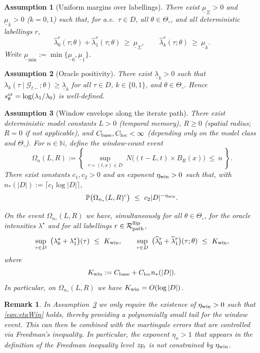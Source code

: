 \documentclass{statsoc}
\newtheorem{assumption}[assumption]{Assumption}
\newtheorem{remark}[remark]{Remark}
\newcommand{\bbP}{\mathbb{P}}
\newcommand{\1}{\mathbbm{1}}
\newcommand{\bbN}{\mathbb{N}}
\begin{document}
\begin{assumption}[Uniform margins over labellings]\label{ass:G1}
There exist $\underline\mu_\Sigma>0$ and $\underline\mu_k>0$ ($k=0,1$) such that, for a.e.\ $\tau\in D$, all $\theta\in\Theta_\circ$, and all deterministic labellings $r$,
\[
\widehat\lambda_0^r(\tau;\theta)+\widehat\lambda_1^r(\tau;\theta)\ \ge\ \underline\mu_\Sigma,\qquad
\widehat\lambda_k^r(\tau;\theta)\ \ge\ \underline\mu_k.
\]
Write $\underline\mu_{\min}:=\min\{\underline\mu_0,\underline\mu_1\}$.
\end{assumption}

\begin{assumption}[Oracle positivity]\label{ass:oracle-positivity}
There exist $\underline\lambda_k>0$ such that $\lambda_k(\tau\mid\mathcal G_{t-};\theta)\ge \underline\lambda_k$ for all $\tau\in D$, $k\in\{0,1\}$, and $\theta\in\Theta_\circ$. Hence $s_\theta^{\rm or}=\log(\lambda_1/\lambda_0)$ is well-defined.
\end{assumption}

\begin{assumption}[Window envelope along the iterate path]\label{ass:G2prime}
There exist deterministic model constants $L>0$ (temporal memory), $R\ge 0$ (spatial radius; $R=0$ if not applicable), and $C_{\rm base},C_{\rm loc}<\infty$ (depending only on the model class and $\Theta_\circ$). For $n\in\bbN$, define the window-count event
\[
\Omega_{n}(L,R):=\left\{\ \sup_{\tau=(t,x)\in D}\ N\Big( (t-L,t)\times B_R(x) \Big)\ \le\ n\ \right\}.
\]
There exist constants $c_1,c_2>0$ and an exponent $\eta_{\rm win}>0$ such that, with $n_*(|D|):=\lceil c_1\log|D|\rceil$,
\begin{equation}\label{eqn:etaWin}
    \bbP\big(\Omega_{n_*}(L,R)^c\big)\ \le\ c_2 |D|^{-\eta_{\rm win}}. 
\end{equation}

On the event $\Omega_{n_*}(L,R)$ we have, simultaneously for all $\theta\in\Theta_\circ$, for the oracle intensities $\lambda^\star$ and for all labellings $r\in \mathcal R_{\rm path}^{\rm flip}$,
\[
\sup_{\tau\in D}\ \big(\lambda_0^\star+\lambda_1^\star\big)(\tau)\ \le\ K_{\rm win},\qquad
\sup_{\tau\in D}\ \big(\widehat\lambda_0^r+\widehat\lambda_1^r\big)(\tau;\theta)\ \le\ K_{\rm win},
\]
where
\[
K_{\rm win}:=C_{\rm base}+C_{\rm loc} n_*(|D|).
\]
In particular, on $\Omega_{n_*}(L,R)$ we have $K_{\rm win}=O(\log|D|)$.
\end{assumption}

\begin{remark}
In Assumption~\ref{ass:G2prime} we only require the existence of $\eta_{\rm win}>0$ such that \cref{eqn:etaWin} holds, thereby providing a polynomially small tail for the window event. This can then be combined with the martingale errors that are controlled  via Freedman's inequality. In particular, the exponent $\eta_x>1$ that appears in the definition of the Freedman inequality level $z_{\rm Fr}$ is not constrained by $\eta_{\rm win}$.
\end{remark}
\end{document}
